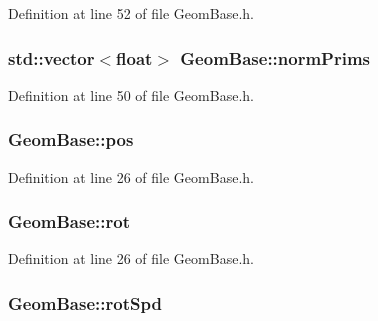 Definition at line 52 of file Geom\-Base.\-h.

\hypertarget{class_geom_base_ab225e16399ab6264821b49160f0fe437}{
\subsubsection[{norm\-Prims}]{\setlength{\rightskip}{0pt plus 5cm}std\-::vector$<$float$>$ Geom\-Base\-::norm\-Prims\hspace{0.3cm}{\ttfamily [protected]}}}\label{class_geom_base_ab225e16399ab6264821b49160f0fe437}


Definition at line 50 of file Geom\-Base.\-h.

\hypertarget{class_geom_base_ace2fc0557767dbb702aaf1655a85ed92}{
\subsubsection[{pos}]{ Geom\-Base\-::pos\hspace{0.3cm}{\ttfamily [protected]}}}\label{class_geom_base_ace2fc0557767dbb702aaf1655a85ed92}


Definition at line 26 of file Geom\-Base.\-h.

\hypertarget{class_geom_base_a7de363bab1e976c73e495cf973a51de7}{
\subsubsection[{rot}]{ Geom\-Base\-::rot\hspace{0.3cm}{\ttfamily [protected]}}}\label{class_geom_base_a7de363bab1e976c73e495cf973a51de7}


Definition at line 26 of file Geom\-Base.\-h.

\hypertarget{class_geom_base_a4be21b8e87e34a60ad9a2a38aae69ea1}{
\subsubsection[{rot\-Spd}]{ Geom\-Base\-::rot\-Spd\hspace{0.3cm}{\ttfamily [protected]}}}\label{class_geom_base_a4be21b8e87e34a60ad9a2a38aae69ea1}


